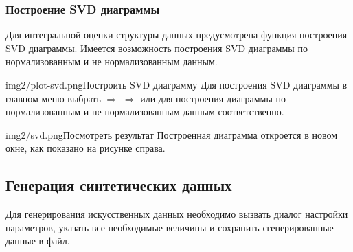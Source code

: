 \documentclass[12pt,tikz]{instruction}
\begin{document}
\newpage
\subsubsection{Построение SVD диаграммы}
\label{subsubsec:svd}
Для интегральной оценки структуры данных предусмотрена функция построения SVD диаграммы. Имеется возможность построения SVD диаграммы по нормализованным и не нормализованным данным.
\begin{steps}
	\begin{ist}{img2/plot-svd.png}{Построить SVD диаграмму}
		Для построения SVD диаграммы в главном меню выбрать  $\Rightarrow$  $\Rightarrow$  или  для построения диаграммы по нормализованным и не нормализованным данным соответственно.
	\end{ist}

	\begin{ist}{img2/svd.png}{Посмотреть результат}
		Построенная диаграмма откроется в новом окне, как показано на рисунке справа.\vspace{6.5cm}
	\end{ist}
\end{steps}

\subsection{Генерация синтетических данных}
\label{subsec:generation}
Для генерирования искусственных данных необходимо вызвать диалог настройки параметров, указать все необходимые величины и сохранить сгенерированные данные в файл.
\end{document}
